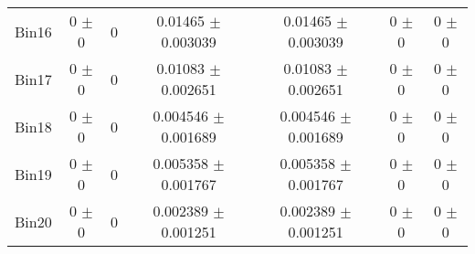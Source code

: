 \begin{tabular}{@{\extracolsep{4pt}}lcccccc@{}}
     Bin16 & 0 $\pm$ 0 & 0 & 0.01465 $\pm$ 0.003039 & 0.01465 $\pm$ 0.003039 & 0 $\pm$ 0 & 0 $\pm$ 0 \\ 
     Bin17 & 0 $\pm$ 0 & 0 & 0.01083 $\pm$ 0.002651 & 0.01083 $\pm$ 0.002651 & 0 $\pm$ 0 & 0 $\pm$ 0 \\ 
     Bin18 & 0 $\pm$ 0 & 0 & 0.004546 $\pm$ 0.001689 & 0.004546 $\pm$ 0.001689 & 0 $\pm$ 0 & 0 $\pm$ 0 \\ 
     Bin19 & 0 $\pm$ 0 & 0 & 0.005358 $\pm$ 0.001767 & 0.005358 $\pm$ 0.001767 & 0 $\pm$ 0 & 0 $\pm$ 0 \\ 
     Bin20 & 0 $\pm$ 0 & 0 & 0.002389 $\pm$ 0.001251 & 0.002389 $\pm$ 0.001251 & 0 $\pm$ 0 & 0 $\pm$ 0 \\ 
\hline\hline
  \end{tabular}

